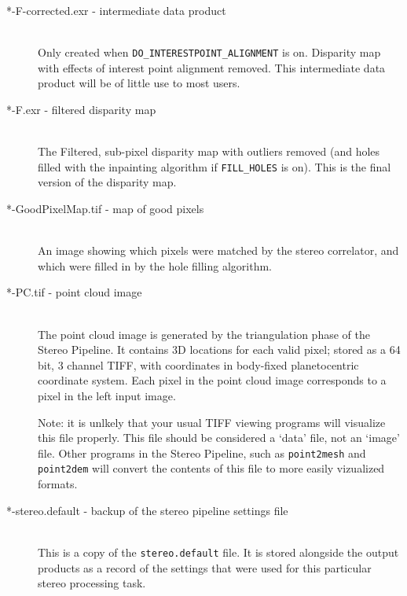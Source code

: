 \begin{description}
\item[*-F-corrected.exr - intermediate data product] \hfill \\

  Only created when \texttt{DO\_INTERESTPOINT\_ALIGNMENT} is on.
  Disparity map with effects of interest point alignment removed.
  This intermediate data product will be of little use to most users.

\item[*-F.exr - filtered disparity map] \hfill \\ 

  The Filtered, sub-pixel disparity map with outliers removed (and
  holes filled with the inpainting algorithm if \texttt{FILL\_HOLES}
  is on).  This is the final version of the disparity map.

\item[*-GoodPixelMap.tif - map of good pixels] \hfill \\

  An image showing which pixels were matched by the stereo correlator,
  and which were filled in by the hole filling algorithm.

\item[*-PC.tif - point cloud image] \hfill \\

  The point cloud image is generated by the triangulation phase of the
  Stereo Pipeline.  It contains 3D locations for each valid pixel;
  stored as a 64 bit, 3 channel TIFF, with coordinates in body-fixed
  planetocentric coordinate system.  Each pixel in the point cloud
  image corresponds to a pixel in the left input image.

  Note: it is unlkely that your usual TIFF viewing programs will
  visualize this file properly.  This file should be considered a
  `data' file, not an `image' file.  Other programs in the Stereo
  Pipeline, such as {\tt point2mesh} and {\tt point2dem} will convert
  the contents of this file to more easily vizualized formats.

\item[*-stereo.default - backup of the stereo pipeline settings file]
  \hfill \\ This is a copy of the \texttt{stereo.default} file.  It is
  stored alongside the output products as a record of the settings
  that were used for this particular stereo processing task.

\end{description}

